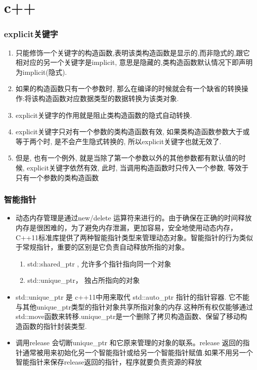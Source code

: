 \section{c++}

\begin{frame}
\frametitle{explicit关键字}
\begin{enumerate}
	\item 只能修饰一个关键字的构造函数,表明该类构造函数是显示的,而非隐式的,跟它相对应的另一个关键字是implicit, 意思是隐藏的,类构造函数默认情况下即声明为implicit(隐式).
	\item 如果的构造函数只有一个参数时, 那么在编译的时候就会有一个缺省的转换操作:将该{\color{red}构造函数对应数据类型的数据转换为该类对象}.
	\item explicit关键字的作用就是{\color{red}阻止类构造函数的隐式自动转换}.
	\item explicit关键字只对有一个参数的类构造函数有效, 如果类构造函数参数大于或等于两个时, 是不会产生隐式转换的, 所以explicit关键字也就无效了.
	\item 但是, 也有一个例外, 就是当除了第一个参数以外的其他参数都有默认值的时候, explicit关键字依然有效, 此时, 当调用构造函数时只传入一个参数, 等效于只有一个参数的类构造函数
\end{enumerate}

\end{frame}

\begin{frame}
\frametitle{智能指针}
\begin{itemize}
	\item 动态内存管理是通过new/delete 运算符来进行的。由于确保在正确的时间释放内存是很困难的，为了避免内存泄漏，更加容易，安全地使用动态内存，C++11标准库提供了两种智能指针类型来管理动态对象。智能指针的行为类似于常规指针，重要的区别是它负责自动释放所指的对象。
	\begin{enumerate}
		\item std::shared\_ptr ,  允许多个指针指向同一个对象
		\item std::unique\_ptr， 独占所指向的对象
	\end{enumerate}
	\item std::unique\_ptr 是 c++11中用来取代 std::auto\_ptr 指针的指针容器. 它不能与其他unique\_ptr类型的指针对象共享所指对象的内存.这种所有权仅能够通过std::move函数来转移.unique\_ptr是一个删除了拷贝构造函数、保留了移动构造函数的指针封装类型.
	\item 调用release 会切断unique\_ptr 和它原来管理的对象的联系。release 返回的指针通常被用来初始化另一个智能指针或给另一个智能指针赋值.如果不用另一个智能指针来保存release返回的指针，程序就要负责资源的释放
\end{itemize}
\end{frame}

